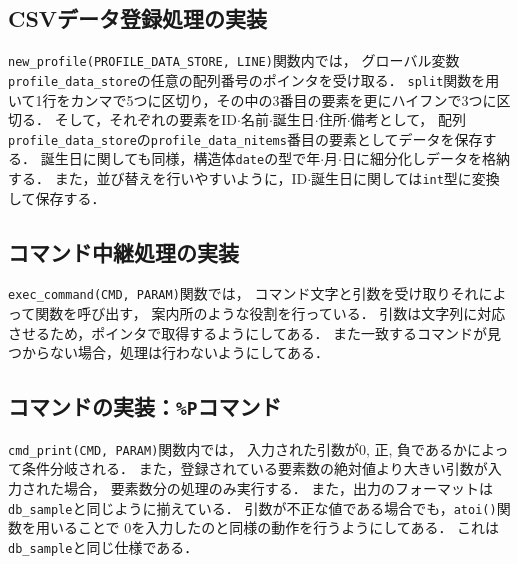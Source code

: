 \documentclass[autodetect-engine,dvi=dvipdfmx,ja=standard,
               a4j,11pt]{bxjsarticle}
\begin{document}
\subsection{CSVデータ登録処理の実装}

\verb|new_profile(PROFILE_DATA_STORE, LINE)|関数内では，
グローバル変数\verb|profile_data_store|の任意の配列番号のポインタを受け取る．
\verb|split|関数を用いて1行をカンマで5つに区切り，その中の3番目の要素を更にハイフンで3つに区切る．
そして，それぞれの要素をID$\cdot$名前$\cdot$誕生日$\cdot$住所$\cdot$備考として，
配列\verb|profile_data_store|の\verb|profile_data_nitems|番目の要素としてデータを保存する．
誕生日に関しても同様，構造体\verb|date|の型で年$\cdot$月$\cdot$日に細分化しデータを格納する．
また，並び替えを行いやすいように，ID$\cdot$誕生日に関しては\verb|int|型に変換して保存する．

\subsection{コマンド中継処理の実装}

\verb|exec_command(CMD, PARAM)|関数では，
コマンド文字と引数を受け取りそれによって関数を呼び出す，
案内所のような役割を行っている．
引数は文字列に対応させるため，ポインタで取得するようにしてある．
また一致するコマンドが見つからない場合，処理は行わないようにしてある．

\subsection{コマンドの実装：\texttt{\%P}コマンド}

\verb|cmd_print(CMD, PARAM)|関数内では，
入力された引数が0, 正, 負であるかによって条件分岐される．
また，登録されている要素数の絶対値より大きい引数が入力された場合，
要素数分の処理のみ実行する．
また，出力のフォーマットは\verb|db_sample|と同じように揃えている．
引数が不正な値である場合でも，\verb|atoi()|関数を用いることで
$0$を入力したのと同様の動作を行うようにしてある．
これは\verb|db_sample|と同じ仕様である．

\end{document}
